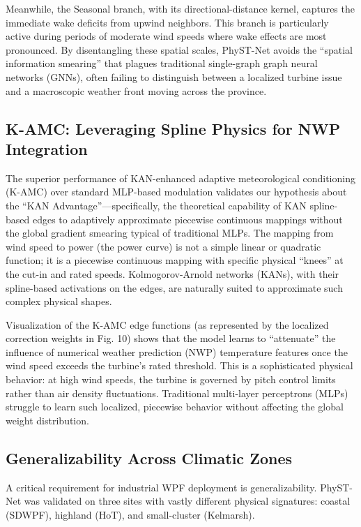 Meanwhile, the Seasonal branch, with its directional-distance kernel, captures the immediate wake deficits from upwind neighbors. This branch is particularly active during periods of moderate wind speeds where wake effects are most pronounced. By disentangling these spatial scales, PhyST-Net avoids the ``spatial information smearing'' that plagues traditional single-graph graph neural networks (GNNs), often failing to distinguish between a localized turbine issue and a macroscopic weather front moving across the province.

\subsection{K-AMC: Leveraging Spline Physics for NWP Integration}
\label{sec:kamc_physics}
The superior performance of KAN-enhanced adaptive meteorological conditioning (K-AMC) over standard MLP-based modulation validates our hypothesis about the ``KAN Advantage''—specifically, the theoretical capability of KAN spline-based edges to adaptively approximate piecewise continuous mappings without the global gradient smearing typical of traditional MLPs. The mapping from wind speed to power (the power curve) is not a simple linear or quadratic function; it is a piecewise continuous mapping with specific physical ``knees'' at the cut-in and rated speeds. Kolmogorov-Arnold networks (KANs), with their spline-based activations on the edges, are naturally suited to approximate such complex physical shapes. 

Visualization of the K-AMC edge functions (as represented by the localized correction weights in Fig. 10) shows that the model learns to ``attenuate'' the influence of numerical weather prediction (NWP) temperature features once the wind speed exceeds the turbine's rated threshold. This is a sophisticated physical behavior: at high wind speeds, the turbine is governed by pitch control limits rather than air density fluctuations. Traditional multi-layer perceptrons (MLPs) struggle to learn such localized, piecewise behavior without affecting the global weight distribution.

\subsection{Generalizability Across Climatic Zones}
\label{sec:generalizability}
A critical requirement for industrial WPF deployment is generalizability. PhyST-Net was validated on three sites with vastly different physical signatures: coastal (SDWPF), highland (HoT), and small-cluster (Kelmarsh). 

